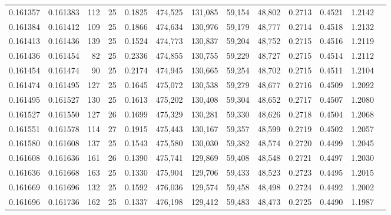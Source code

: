 \begin{tabular}{rrrrrrrrrrrrr}
0.161357 & 0.161383 & 112 &  25 &                                     0.1825 & 474,525 & 131,085 &  59,154 &  48,802 & 0.2713 & 0.4521 & 1.2142 \\
0.161384 & 0.161412 & 109 &  25 &                                     0.1866 & 474,634 & 130,976 &  59,179 &  48,777 & 0.2714 & 0.4518 & 1.2132 \\
0.161413 & 0.161436 & 139 &  25 &                                     0.1524 & 474,773 & 130,837 &  59,204 &  48,752 & 0.2715 & 0.4516 & 1.2119 \\
0.161436 & 0.161454 &  82 &  25 &                                     0.2336 & 474,855 & 130,755 &  59,229 &  48,727 & 0.2715 & 0.4514 & 1.2112 \\
0.161454 & 0.161474 &  90 &  25 &                                     0.2174 & 474,945 & 130,665 &  59,254 &  48,702 & 0.2715 & 0.4511 & 1.2104 \\
0.161474 & 0.161495 & 127 &  25 &                                     0.1645 & 475,072 & 130,538 &  59,279 &  48,677 & 0.2716 & 0.4509 & 1.2092 \\
0.161495 & 0.161527 & 130 &  25 &                                     0.1613 & 475,202 & 130,408 &  59,304 &  48,652 & 0.2717 & 0.4507 & 1.2080 \\
0.161527 & 0.161550 & 127 &  26 &                                     0.1699 & 475,329 & 130,281 &  59,330 &  48,626 & 0.2718 & 0.4504 & 1.2068 \\
0.161551 & 0.161578 & 114 &  27 &                                     0.1915 & 475,443 & 130,167 &  59,357 &  48,599 & 0.2719 & 0.4502 & 1.2057 \\
0.161580 & 0.161608 & 137 &  25 &                                     0.1543 & 475,580 & 130,030 &  59,382 &  48,574 & 0.2720 & 0.4499 & 1.2045 \\
0.161608 & 0.161636 & 161 &  26 &                                     0.1390 & 475,741 & 129,869 &  59,408 &  48,548 & 0.2721 & 0.4497 & 1.2030 \\
0.161636 & 0.161668 & 163 &  25 &                                     0.1330 & 475,904 & 129,706 &  59,433 &  48,523 & 0.2723 & 0.4495 & 1.2015 \\
0.161669 & 0.161696 & 132 &  25 &                                     0.1592 & 476,036 & 129,574 &  59,458 &  48,498 & 0.2724 & 0.4492 & 1.2002 \\
0.161696 & 0.161736 & 162 &  25 &                                     0.1337 & 476,198 & 129,412 &  59,483 &  48,473 & 0.2725 & 0.4490 & 1.1987 \\

\end{tabular}
